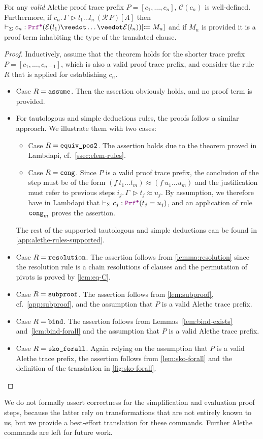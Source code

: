\smallskip

\begin{theorem}\label{theorem:soundness}
  For any \emph{valid} Alethe proof trace prefix $P = [c_1, \dots, c_n]$, $\mathcal{C}(c_n)$ is well-defined. Furthermore, if $c_n.\,\Gamma\, \triangleright l_1 \dots l_n \, (\mathcal{R}\,P)[A]$ then $\vdash_\Sigma c_n : \pid (\E{l_1} \veedot \dots  \veedot \E{l_n}) [\coloneq M_n]$ and if $M_n$ is provided it is a proof term inhabiting the type of the translated clause.
\end{theorem}
\begin{proof}
  Inductively, assume that the theorem holds for the shorter trace prefix $P = [c_1, \dots, c_{n-1}]$, which is also a valid proof trace prefix, and consider the rule $R$ that is applied for establishing $c_n$.
  \begin{itemize}
  \item Case $R = \texttt{\upshape{assume}}$. Then the assertion obviously holds, and no proof term is provided.
  \item For tautologous and simple deductions rules, the proofs follow a similar approach. We illustrate them with two cases:
  \begin{itemize}
  \item Case $R = \texttt{\upshape{equiv\_pos2}}$. The assertion holds due to the theorem  proved in Lambdapi, cf.\ \cref{ssec:elem-rules}.
  \item Case $R = \texttt{\upshape{cong}}$. Since $P$ is a valid proof trace prefix, the conclusion of the step must be of the form $(f~t_1 \ldots t_m) \approx (f~u_1 \ldots u_m)$ and the justification must refer to previous steps $i_j.\,\Gamma\,\triangleright t_j \approx u_j$. By assumption, we therefore have in Lambdapi that $\vdash_{\Sigma} c_j: \pid (t_j = u_j)$, and an application of rule $\texttt{\upshape{cong}}_m$ proves the assertion.
  \end{itemize}
  The rest of the supported tautologous and simple deductions can be found in \cref{app:alethe-rules-supported}.
  \item Case $R = \texttt{\upshape{resolution}}$. The assertion follows from \cref{lemma:resolution} since the resolution rule is a chain resolutions of clauses and the permutation of pivots is proved by \cref{lem:eq-C}.
  \item Case $R = \texttt{\upshape{subproof}}$. The assertion follows from \cref{lem:subproof}, cf.\ \cref{app:subproof}, and the assumption that $P$ is a valid Alethe trace prefix.
  \item Case $R = \texttt{\upshape{bind}}$. The assertion follows from Lemmas~\ref{lem:bind-exists} and~\ref{lem:bind-forall} and the assumption that $P$ is a valid Alethe trace prefix.
  \item Case $R = \texttt{\upshape{sko\_forall}}$. Again relying on the assumption that $P$ is a valid Alethe trace prefix, the assertion follows from \cref{lem:sko-forall} and the definition of the translation in \cref{fig:sko-forall}.
  \end{itemize}
\end{proof}

We do not formally assert correctness for the simplification and evaluation proof steps, because the latter rely on transformations that are not entirely known to us, but we provide a best-effort translation for these commands. Further Alethe commands are left for future work.
